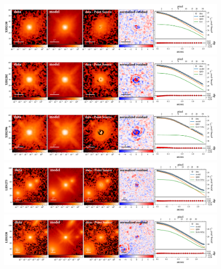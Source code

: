 \documentclass[apj]{emulateapj}
\begin{document}
\begin{figure}
\centering
{
\includegraphics[height=0.25\textwidth]{fig/best_fit_XID2138_SB_profile.pdf}
\includegraphics[height=0.25\textwidth]{fig/best_fit_XID2202_SB_profile.pdf}
\includegraphics[height=0.25\textwidth]{fig/best_fit_XID2396_SB_profile.pdf}
\includegraphics[height=0.25\textwidth]{fig/best_fit_LID1273_SB_profile.pdf}
\includegraphics[height=0.25\textwidth]{fig/best_fit_LID1538_SB_profile.pdf}
}
\end{figure} 
\end{document}
